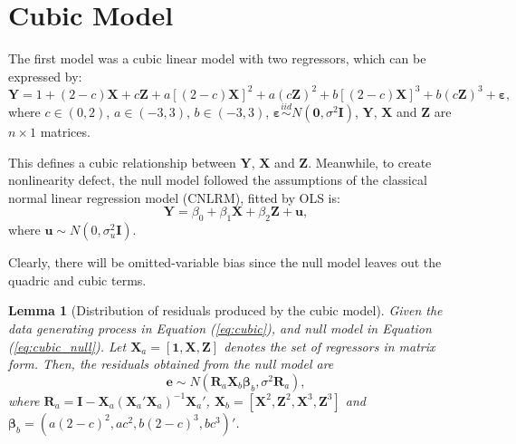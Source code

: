 \documentclass{monashthesis}
\newtheorem{lemma}{Lemma}[chapter]
\theoremstyle{definition}
\theoremstyle{definition}
\theoremstyle{definition}
\theoremstyle{definition}
\theoremstyle{remark}
\begin{document}
\hypertarget{cubic-model}{%
\section{Cubic Model}\label{cubic-model}}

The first model was a cubic linear model with two regressors, which can be expressed by:
\begin{equation} \label{eq:cubic}
\boldsymbol{Y}= 1 + (2-c)\boldsymbol{X} + c\boldsymbol{Z} + a[(2-c)\boldsymbol{X}]^2+a(c\boldsymbol{Z})^2+b[(2-c)\boldsymbol{X}]^3+b(c\boldsymbol{Z})^3+\boldsymbol{\varepsilon},
\end{equation}
where \(c \in (0,2)\), \(a \in (-3,3)\), \(b \in (-3,3)\), \(\boldsymbol{\varepsilon}\overset{iid}{\sim} N(\boldsymbol{0},\sigma^2\boldsymbol{I})\), \(\boldsymbol{Y}\), \(\boldsymbol{X}\) and \(\boldsymbol{Z}\) are \(n\times1\) matrices.

This defines a cubic relationship between \(\boldsymbol{Y}\), \(\boldsymbol{X}\) and \(\boldsymbol{Z}\). Meanwhile, to create nonlinearity defect, the null model followed the assumptions of the classical normal linear regression model (CNLRM), fitted by OLS is:
\begin{equation} \label{eq:cubic_null}
\boldsymbol{Y}=\beta_0+\beta_1\boldsymbol{X}+\beta_2\boldsymbol{Z}+\boldsymbol{u},
\end{equation}
where \(\boldsymbol{u} \sim N(0,\sigma^2_u\boldsymbol{I})\).

Clearly, there will be omitted-variable bias since the null model leaves out the quadric and cubic terms.

\begin{lemma}[Distribution of residuals produced by the cubic model] \label{lemma:cubic}
Given the data generating process in Equation (\ref{eq:cubic}), and null model in Equation (\ref{eq:cubic_null}). Let $\boldsymbol{X}_a=[\boldsymbol{1},\boldsymbol{X},\boldsymbol{Z}]$ denotes the set of regressors in matrix form. Then, the residuals obtained from the null model are $$\boldsymbol{e} \sim N(\boldsymbol{R}_a\boldsymbol{X}_b\boldsymbol{\beta}_b, \sigma^2\boldsymbol{R}_a),$$ where $\boldsymbol{R}_a=\boldsymbol{I}-\boldsymbol{X}_a(\boldsymbol{X}_a'\boldsymbol{X}_a)^{-1}\boldsymbol{X}_a'$, $\boldsymbol{X}_b=[\boldsymbol{X}^2,\boldsymbol{Z}^2,\boldsymbol{X}^3,\boldsymbol{Z}^3]$ and $\boldsymbol{\beta}_b=(a(2-c)^2,ac^2,b(2-c)^3,bc^3)'$.
\end{lemma}
\end{document}
